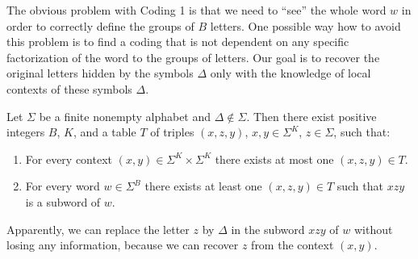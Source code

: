The obvious problem with Coding 1 is that we need to ``see'' the whole word $w$ in order to correctly define the groups of $B$ letters. One possible way how to avoid this problem is to find a coding that is not dependent on any specific factorization of the word to the groups of letters. Our goal is to recover the original letters hidden by the symbols $\Delta$ only with the knowledge of local contexts of these symbols $\Delta$.

\begin{theorem}[Coding 2]\label{theorem:dxclra_coding_2}
Let $\Sigma$ be a finite nonempty alphabet and $\Delta \notin \Sigma$. Then there exist positive integers $B$, $K$, and a table $T$ of triples $(x, z, y)$, $x, y \in \Sigma^K$, $z \in \Sigma$, such that:
\begin{enumerate}
\item\label{theorem:dxclra_coding_2:a}
For every context $(x, y) \in \Sigma^K \times \Sigma^K$ there exists at most one $(x, z, y) \in T$.
\item\label{theorem:dxclra_coding_2:b} For every word $w \in \Sigma^B$ there exists at least one $(x, z, y) \in T$ such that $xzy$ is a subword of $w$.
\end{enumerate}
\end{theorem}

Apparently, we can replace the letter $z$ by $\Delta$ in the subword $xzy$ of $w$ without losing any information, because we can recover $z$ from the context $(x, y)$.

